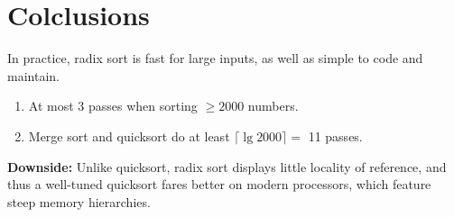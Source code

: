 \documentclass[11pt,toc=twocol]{elegantbook}
\begin{document}
\section{Colclusions}
In practice, radix sort is fast for large inputs, as well as simple to code and maintain.
\begin{example}
    \begin{enumerate}
        \item At most 3 passes when sorting $\geq 2000$ numbers. 
        \item Merge sort and quicksort do at least $\lceil\lg 2000\rceil=$ 11 passes.
    \end{enumerate}
\end{example}

\begin{note}
    \textbf{Downside:} Unlike quicksort, radix sort displays little locality of reference, and thus a well-tuned quicksort fares better on modern processors, which feature steep memory hierarchies.
\end{note}
\end{document}
